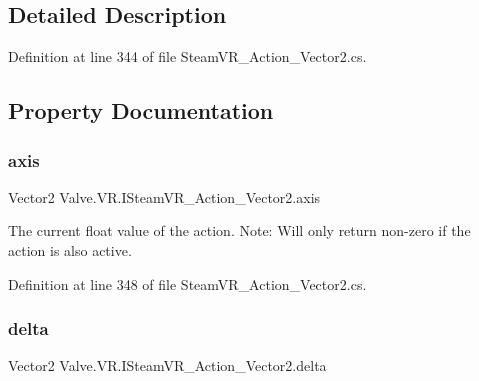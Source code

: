 \subsection{Detailed Description}


Definition at line 344 of file Steam\+V\+R\+\_\+\+Action\+\_\+\+Vector2.\+cs.



\subsection{Property Documentation}
\mbox{\label{interface_valve_1_1_v_r_1_1_i_steam_v_r___action___vector2_a90a192dee01024a2a0eaffe6d652f9d6}} 
\subsubsection{\texorpdfstring{axis}{axis}}
{\footnotesize\ttfamily Vector2 Valve.\+V\+R.\+I\+Steam\+V\+R\+\_\+\+Action\+\_\+\+Vector2.\+axis\hspace{0.3cm}{\ttfamily [get]}}



The current float value of the action. Note\+: Will only return non-\/zero if the action is also active. 



Definition at line 348 of file Steam\+V\+R\+\_\+\+Action\+\_\+\+Vector2.\+cs.

\mbox{\label{interface_valve_1_1_v_r_1_1_i_steam_v_r___action___vector2_aba4ebd5aa9cd8f26fd28c1a01dc5d327}} 
\subsubsection{\texorpdfstring{delta}{delta}}
{\footnotesize\ttfamily Vector2 Valve.\+V\+R.\+I\+Steam\+V\+R\+\_\+\+Action\+\_\+\+Vector2.\+delta\hspace{0.3cm}{\ttfamily [get]}}



